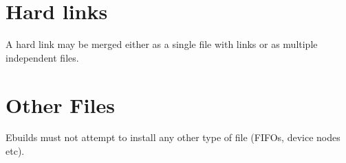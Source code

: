 \section{Hard links}

A hard link may be merged either as a single file with links or as multiple independent files.

\section{Other Files}

Ebuilds must not attempt to install any other type of file (FIFOs, device nodes etc).


